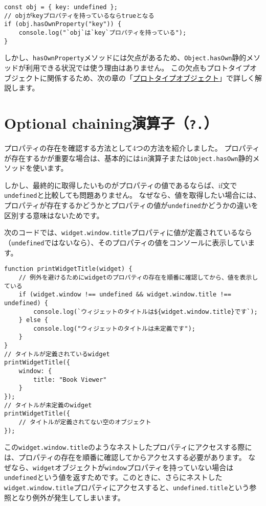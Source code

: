 \begin{lstlisting}
const obj = { key: undefined };
// objがkeyプロパティを持っているならtrueとなる
if (obj.hasOwnProperty("key")) {
    console.log("`obj`は`key`プロパティを持っている");
}
\end{lstlisting}

しかし、\texttt{hasOwnProperty}メソッドには欠点があるため、\texttt{Object.hasOwn}静的メソッドが利用できる状況では使う理由はありません。
この欠点もプロトタイプオブジェクトに関係するため、次の章の「\hyperlink{prototype-object}{プロトタイプオブジェクト}」で詳しく解説します。

\hypertarget{optional-chaining-operator}{%
\section[Optional chaining演算子（\texttt{?.}）]{Optional chaining演算子（\texttt{?.}）\,\protect{}}\label{optional-chaining-operator}}

プロパティの存在を確認する方法として4つの方法を紹介しました。
プロパティが存在するかが重要な場合は、基本的には\texttt{in}演算子または\texttt{Object.hasOwn}静的メソッドを使います。

しかし、最終的に取得したいものがプロパティの値であるならば、if文で\texttt{undefined}と比較しても問題ありません。
なぜなら、値を取得したい場合には、プロパティが存在するかどうかとプロパティの値が\texttt{undefined}かどうかの違いを区別する意味はないためです。

次のコードでは、\texttt{widget.window.title}プロパティに値が定義されているなら（\texttt{undefined}ではないなら）、そのプロパティの値をコンソールに表示しています。

\begin{lstlisting}
function printWidgetTitle(widget) {
    // 例外を避けるためにwidgetのプロパティの存在を順番に確認してから、値を表示している
    if (widget.window !== undefined && widget.window.title !== undefined) {
        console.log(`ウィジェットのタイトルは${widget.window.title}です`);
    } else {
        console.log("ウィジェットのタイトルは未定義です");
    }
}
// タイトルが定義されているwidget
printWidgetTitle({
    window: {
        title: "Book Viewer"
    }
});
// タイトルが未定義のwidget
printWidgetTitle({
    // タイトルが定義されてない空のオブジェクト
});
\end{lstlisting}

\enlargethispage{\baselineskip}この\texttt{widget.window.title}のようなネストしたプロパティにアクセスする際には、プロパティの存在を順番に確認してからアクセスする必要があります。
なぜなら、\texttt{widget}オブジェクトが\texttt{window}プロパティを持っていない場合は\texttt{undefined}という値を返すためです。このときに、さらにネストした\texttt{widget.window.title}プロパティにアクセスすると、\texttt{undefined.title}という参照となり例外が発生してしまいます。

